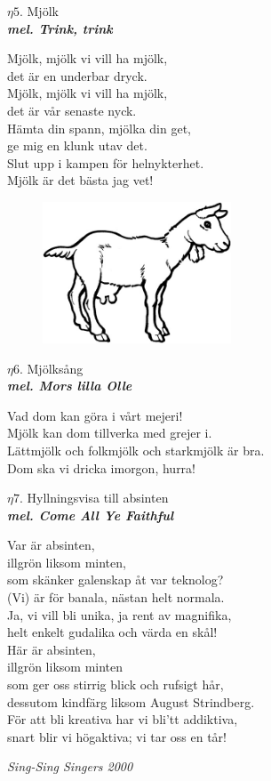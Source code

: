 \documentclass[a6paper,10pt]{article}
\newcommand{\mel}[1]{\small\textbf{\textit{mel. #1 \\}}}
\newcommand{\notis}[1]{\begin{flushright}\textit{#1}\end{flushright}}
\begin{document}
\setlength{\oddsidemargin}{-0.47in}
\noindent
\begin{center}
\Large $\eta5$. Mjölk\\
\mel{Trink, trink}
\end{center}
Mjölk, mjölk vi vill ha mjölk,\\
det är en underbar dryck.\\
Mjölk, mjölk vi vill ha mjölk,\\
det är vår senaste nyck.\\
Hämta din spann, mjölka din get,\\
ge mig en klunk utav det.\\
Slut upp i kampen för helnykterhet.\\
Mjölk är det bästa jag vet!
\begin{figure}[!h]
\hfill
\includegraphics[width=0.5\textwidth]{goat.png}
\end{figure}
\begin{center}
\Large $\eta6$. Mjölksång\\
\mel{Mors lilla Olle}
\end{center}
Vad dom kan göra i vårt mejeri!\\
Mjölk kan dom tillverka med grejer i.\\
Lättmjölk och folkmjölk och starkmjölk är bra.\\
Dom ska vi dricka imorgon, hurra!

\setlength{\oddsidemargin}{-0.37in}
\noindent
\begin{center}
\Large $\eta7$. Hyllningsvisa till absinten\\
\mel{Come All Ye Faithful}
\end{center}
Var är absinten,\\
illgrön liksom minten,\\
som skänker galenskap åt var teknolog?
\vspace{5pt}\\
(Vi) är för banala, nästan helt normala.\\
Ja, vi vill bli unika, ja rent av magnifika,\\
helt enkelt gudalika och värda en skål!
\vspace{5pt}\\
Här är absinten,\\
illgrön liksom minten\\
som ger oss stirrig blick och rufsigt hår,
\vspace{5pt}\\
dessutom kindfärg liksom August Strindberg.\\
För att bli kreativa har vi bli'tt addiktiva,\\
snart blir vi högaktiva; vi tar oss en tår! 
\notis{Sing-Sing Singers 2000}
\end{document}
